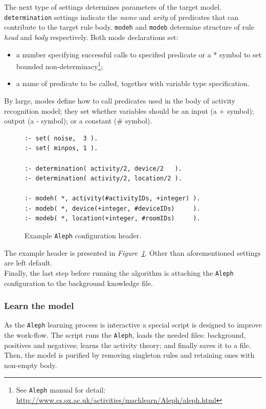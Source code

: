 \documentclass[11pt, a4paper, pdflatex, leqno, twoside, openright]{report}
\begin{document}
The next type of settings determines parameters of the target model. \texttt{determination} settings indicate the \emph{name} and \emph{arity} of predicates that can contribute to the target rule body. \texttt{modeh} and \texttt{modeb} determine structure of rule \emph{head} and \emph{body} respectively. Both mode declarations set:
\begin{itemize}
\item a number specifying successful calls to specified predicate or a * symbol to set bounded non-determinacy\footnote{See \texttt{Aleph} manual for detail: \url{http://www.cs.ox.ac.uk/activities/machlearn/Aleph/aleph.html}};
\item a name of predicate to be called, together with variable type specification.
\end{itemize}
By large, modes define how to call predicates used in the body of activity recognition model; they set whether variables should be an input (a + symbol); output (a - symbol); or a constant (\# symbol).\\

\begin{figure}[htb]
  \begin{verbatim}
:- set( noise,  3 ).
:- set( minpos, 1 ).

:- determination( activity/2, device/2   ).
:- determination( activity/2, location/2 ).

:- modeh( *, activity(#activityIDs, +integer) ).
:- modeb( *, device(+integer, #deviceIDs)     ).
:- modeb( *, location(+integer, #roomIDs)     ).
  \end{verbatim}
  \caption{Example \texttt{Aleph} configuration header.\label{lst:alephConfHead}}
\end{figure}

The example header is presented in \emph{Figure~\ref{lst:alephConfHead}}. Other than aforementioned settings are left default.\\
Finally, the last step before running the algorithm is attaching the \texttt{Aleph} configuration to the background knowledge file.

      \subsubsection{Learn the model}
As the \texttt{Aleph} learning process is interactive a special script is designed to improve the work-flow. The script runs the \texttt{Aleph}, loads the needed files: background, positives and negatives; learns the activity theory; and finally saves it to a file.\\
Then, the model is purified by removing singleton rules and retaining ones with non-empty body.\\
\end{document}
